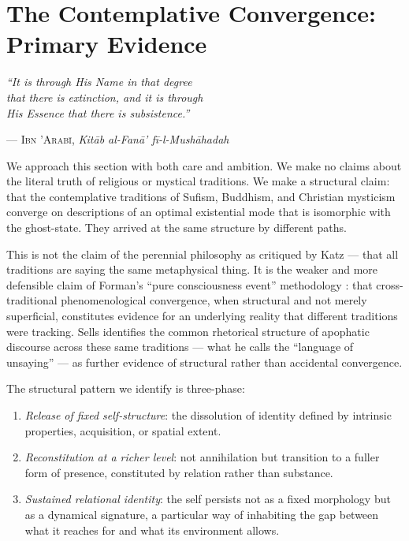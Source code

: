 \documentclass[12pt, a4paper]{article}
\begin{document}
\section{The Contemplative Convergence: Primary Evidence}

\epigraph{
  \textit{``It is through His Name in that degree\\
  that there is extinction, and it is through\\
  His Essence that there is subsistence.''}
}{--- \textsc{Ibn 'Arab\={i},} \textit{Kit\={a}b al-Fan\={a}' f\={i}-l-Mush\={a}hadah}}

We approach this section with both care and ambition. We make no claims about the literal
truth of religious or mystical traditions. We make a structural claim: that the contemplative
traditions of Sufism, Buddhism, and Christian mysticism converge on descriptions of an
optimal existential mode that is isomorphic with the ghost-state. They arrived at the same
structure by different paths.

This is not the claim of the perennial philosophy as critiqued by Katz \citep{forman1990} ---
that all traditions are saying the same metaphysical thing. It is the weaker and more
defensible claim of Forman's ``pure consciousness event'' methodology \citep{forman1990}: that cross-traditional
phenomenological convergence, when structural and not merely superficial, constitutes
evidence for an underlying reality that different traditions were tracking. Sells
\citep{sells1994} identifies the common rhetorical structure of apophatic discourse across
these same traditions --- what he calls the ``language of unsaying'' --- as further evidence
of structural rather than accidental convergence.

The structural pattern we identify is three-phase:

\begin{enumerate}[itemsep=0.3em]
  \item \textit{Release of fixed self-structure}: the dissolution of identity defined by
  intrinsic properties, acquisition, or spatial extent.
  \item \textit{Reconstitution at a richer level}: not annihilation but transition to a
  fuller form of presence, constituted by relation rather than substance.
  \item \textit{Sustained relational identity}: the self persists not as a fixed morphology
  but as a dynamical signature, a particular way of inhabiting the gap between what it
  reaches for and what its environment allows.
\end{enumerate}
\end{document}
